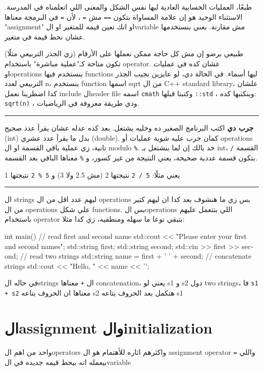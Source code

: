 \documentclass[11pt]{article}
\let\OriginalVerbatim\verbatim
\let\endOriginalVerbatim\endverbatim
\renewenvironment{verbatim}{\begin{english}\OriginalVerbatim}{\endOriginalVerbatim\end{english}}
\begin{document}
طبعًا، العمليات الحسابية العادية ليها نفس الشكل والمعنى اللي اتعلمناه في المدرسة. الاستثناء الوحيد هو إن علامة المساواة بتكون \texttt{==} مش \texttt{=} ، لأن \texttt{=} في البرمجة معناها "assignment" او انك تعين قيمه للمتغير او الvariable مش مقارنة. يعني بنستخدمها عشان نحط قيمة في متغير.

طبيعي برضو إن مش كل حاجة ممكن نعملها على الأرقام (زي الجذر التربيعي مثلًا) تكون متاحة كـ"عملية مباشرة" باستخدام operator. عشان كده في عمليات اوoperations بنستخدم فيها functions ليها أسماء. في الحالة دي، لو عايزين نجيب الجذر التربيعي لعدد n، بنستخدم function اسمها sqrt من ال C++ standard library، علشان كدا اضطرينا نعمل include لheader file اسمه \texttt{cmath} وكتبنا قبلها \texttt{::std} ، وبنكتبها كده: \texttt{sqrt(n)} ، ودي طريقة معروفة في الرياضيات.

\noindent\rule{\textwidth}{0.5pt}
\textbf{جرب دي}
اكتب البرنامج الصغير ده وخليه يشتغل. بعد كده عدله عشان يقرأ عدد صحيح (int) بدل ما يقرأ عدد عشري (double). كمان جرب عليه شوية عمليات أو operations تانية، زي عملية باقي القسمة او ال modulo \texttt{\%}. خد بالك إن لما بنشتغل بـ int، القسمة \texttt{/} بتكون قسمة عددية صحيحة، يعني النتيجة من غير كسور، و \texttt{\%} معناها الباقي بعد القسمة.

يعني مثلًا:
\texttt{5 / 2} نتيجتها 2 (مش 2.5 ولا 3)
و \texttt{5 \% 2} نتيجتها 1

\noindent\rule{\textwidth}{0.5pt}

ال strings ليهم عدد اقل من ال operations بس زي ما هنشوف بعد كدا ان ليهم كتير من ال operations علي شكل functions. بس الoperations اللي بتتعمل عليهم باستخدام operator بتبقي نوعا ما سهله ومنطقيه، زي كدا مثلا:

\begin{verbatim}
int main() {
    // read first and second name
    std::cout << "Please enter your first and second names\n";
    std::string first;
    std::string second;
    std::cin >> first >> second;              // read two strings
    std::string name = first + ' ' + second;  // concatenate strings
    std::cout << "Hello, " << name << '\n';
}
\end{verbatim}

في حاله الstrings ال \texttt{+} معناها concatenation، يعني لو s1 و s2 دول two strings، فا \texttt{s1 + s2} معناها ان الحروف بتاعه s2 هتكمل بعد الحروف بتاعه s1
\section{الassignment والinitialization}
\label{sec:orgda744ea}
واحد من اهم الoperators واكثرهم اثاره للأهتمام هو ال assignment operator \texttt{=} واللي بيعمله انه بيحط قيمه جديده في الvariable
\end{document}
